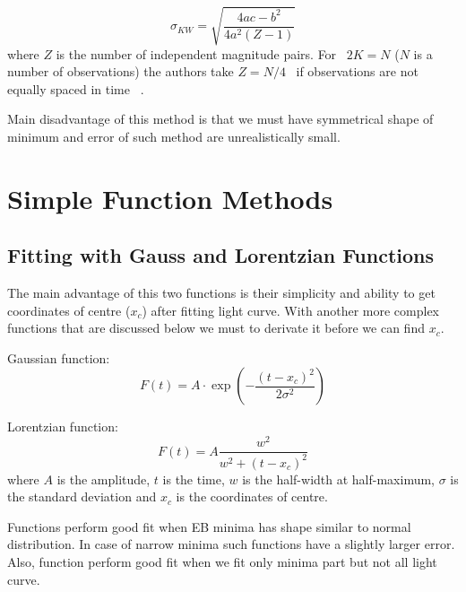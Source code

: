 \begin{equation} \label{eq:kwee_err}
\sigma_{KW} =\sqrt{\frac{4ac-b^2}{4a^2(Z-1)}} 
\end{equation}
where $Z$ is the number of independent magnitude pairs. For~ $2K=N$  ($N$ is a number of observations) the authors take  $Z=N/4$ ~if observations are not equally spaced in time ~\citep{kwee1956, brainhorst1973}.

Main disadvantage of this method is that we must have symmetrical shape of minimum and error of such method are unrealistically small. 

\section{Simple Function Methods}

\subsection{Fitting with Gauss and Lorentzian Functions}
The main advantage of this two functions is their simplicity and ability to get coordinates of centre ($x_{c}$) after fitting light curve.
With another more complex functions that are discussed below we must to derivate it before we can find $x_{c}$.

Gaussian function:
\begin{equation}\label{eq:gaus}
F(t)= A\cdot \exp(-\frac{(t - x_{c})^2}{2\sigma^2})
\end{equation}

Lorentzian function: 
\begin{equation}\label{eq:lorentz}
F(t)= A \frac{w^2}{w^2 + (t - x_{c})^2}
\end{equation}
where $A$ is the amplitude, $t$ is the time, $w$ is the half-width at half-maximum, $\sigma$ is the standard deviation and $x_{c}$ is the coordinates of centre. 

Functions perform good fit when EB minima has shape similar to normal distribution. In case of narrow minima such functions have a slightly larger error. Also, function perform good fit when we fit only minima part but not all light curve.

